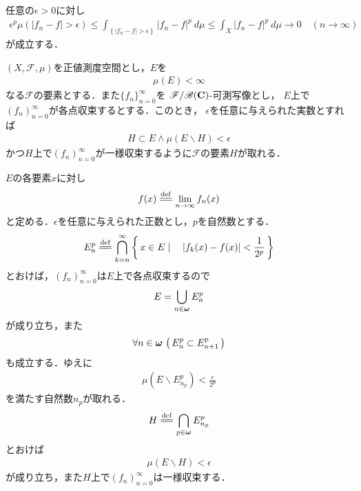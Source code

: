		\begin{prf}
			任意の$\epsilon > 0$に対し
			\begin{align}
				\epsilon^p \mu\left(|f_n - f| > \epsilon\right)
				\leq \int_{\left\{|f_n - f| > \epsilon\right\}} |f_n-f|^p\ d\mu
				\leq \int_X |f_n - f|^p\ d\mu \longrightarrow 0
				\quad (n \longrightarrow \infty)
			\end{align}
			が成立する．
			\QED
		\end{prf}
		
		\begin{screen}
			\begin{thm}[Egorov]\label{thm:Egorov}
				$(X,\mathscr{F},\mu)$を正値測度空間とし，$E$を
				\begin{align}
					\mu(E) < \infty
				\end{align}
				なる$\mathscr{F}$の要素とする．また$\{f_n\}_{n = 0}^\infty$を
				$\mathscr{F}/\mathscr{B}(\mathbf{C})$-可測写像とし，
				$E$上で$(f_n)_{n = 0}^\infty$が各点収束するとする．このとき，
				$\epsilon$を任意に与えられた実数とすれば
				\begin{align}
					H \subset E \wedge \mu(E \backslash H) < \epsilon
				\end{align}
				かつ$H$上で$(f_n)_{n = 0}^\infty$が一様収束するように$\mathscr{F}$の要素$H$が取れる．
			\end{thm}
		\end{screen}
		
		\begin{sketch}
			$E$の各要素$x$に対し
			\begin{align}
				f(x) \defeq \lim_{n \to \infty} f_n(x)
			\end{align}
			と定める．$\epsilon$を任意に与えられた正数とし，$p$を自然数とする．
			\begin{align}
				E_n^p \defeq \bigcap_{k=n}^\infty \Set{x \in E}{|f_k(x) - f(x)| < \frac{1}{2^p}}
			\end{align}
			とおけば，$(f_n)_{n = 0}^\infty$は$E$上で各点収束するので
			\begin{align}
				E = \bigcup_{n \in {\boldsymbol \omega}} E_n^p
			\end{align}
			が成り立ち，また
			\begin{align}
				\forall n \in {\boldsymbol \omega}\, \left(\, E_n^p \subset E_{n+1}^p\, \right)
			\end{align}
			も成立する．ゆえに
			\begin{align}
				\mu(E \backslash E_{n_p}^p) < \frac{\epsilon}{2^p}
			\end{align}
			を満たす自然数$n_p$が取れる．
			\begin{align}
				H \defeq \bigcap_{p \in \Natural} E_{n_p}^p
			\end{align}
			とおけば
			\begin{align}
				\mu(E \backslash H) < \epsilon
			\end{align}
			が成り立ち，また$H$上で$(f_n)_{n = 0}^\infty$は一様収束する．
			\QED
		\end{sketch}
		
